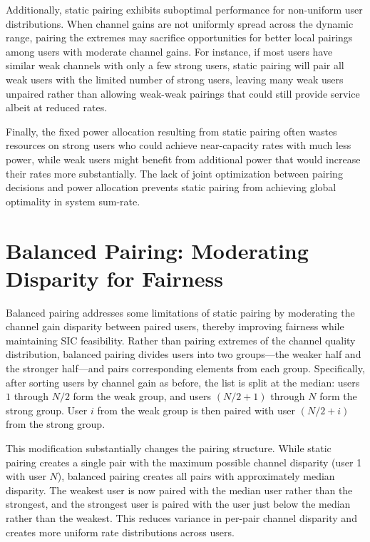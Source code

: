 Additionally, static pairing exhibits suboptimal performance for non-uniform user distributions. When channel gains are not uniformly spread across the dynamic range, pairing the extremes may sacrifice opportunities for better local pairings among users with moderate channel gains. For instance, if most users have similar weak channels with only a few strong users, static pairing will pair all weak users with the limited number of strong users, leaving many weak users unpaired rather than allowing weak-weak pairings that could still provide service albeit at reduced rates.

Finally, the fixed power allocation resulting from static pairing often wastes resources on strong users who could achieve near-capacity rates with much less power, while weak users might benefit from additional power that would increase their rates more substantially. The lack of joint optimization between pairing decisions and power allocation prevents static pairing from achieving global optimality in system sum-rate.

\section{Balanced Pairing: Moderating Disparity for Fairness}

Balanced pairing addresses some limitations of static pairing by moderating the channel gain disparity between paired users, thereby improving fairness while maintaining SIC feasibility. Rather than pairing extremes of the channel quality distribution, balanced pairing divides users into two groups—the weaker half and the stronger half—and pairs corresponding elements from each group. Specifically, after sorting users by channel gain as before, the list is split at the median: users $1$ through $N/2$ form the weak group, and users $(N/2 + 1)$ through $N$ form the strong group. User $i$ from the weak group is then paired with user $(N/2 + i)$ from the strong group.

This modification substantially changes the pairing structure. While static pairing creates a single pair with the maximum possible channel disparity (user 1 with user $N$), balanced pairing creates all pairs with approximately median disparity. The weakest user is now paired with the median user rather than the strongest, and the strongest user is paired with the user just below the median rather than the weakest. This reduces variance in per-pair channel disparity and creates more uniform rate distributions across users.

